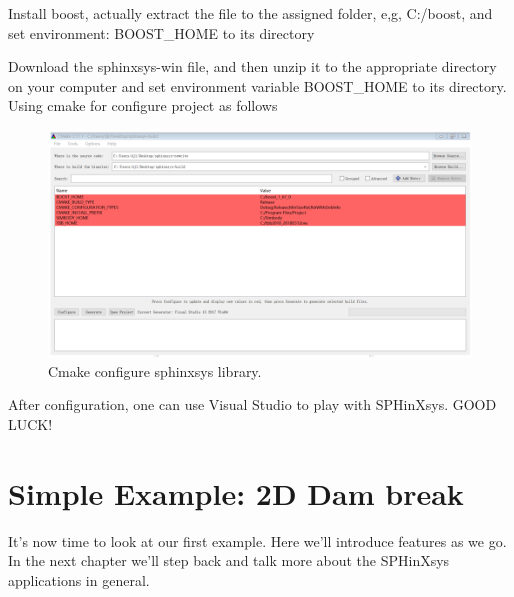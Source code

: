 \documentclass[12pt, a4paper,onecolumn]{article}
\begin{document}
Install boost, actually extract the file to the assigned folder, e,g, C:/boost, and set environment: BOOST\_HOME to its directory

Download the sphinxsys-win file,
and then unzip it to the appropriate directory on your computer and set environment variable BOOST\_HOME to its directory.
Using cmake for configure project as follows 
%
\begin{figure}[tb!]
	\centering
	\includegraphics[width=\textwidth]{figs/cmake-sphinxsys.png}
	\caption{Cmake configure sphinxsys library. }
	\label{figs:win-sphinxsys}
\end{figure}
%
After configuration, one can use Visual Studio to play with SPHinXsys. GOOD LUCK!

\section{Simple Example: 2D Dam break}\label{example}
It’s now time to look at our first example. 
Here we’ll introduce features as we go. In the next chapter we’ll step back and talk more about the SPHinXsys applications in general.
%
\end{document}
